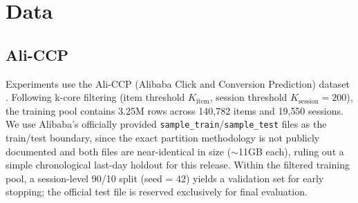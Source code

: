 %
%
%

\section{Data}
\label{sec:data}

\subsection{Ali-CCP}
\label{sec:data-aliccp}

Experiments use the Ali-CCP (Alibaba Click and Conversion Prediction) dataset \cite{ma2018esmm}. Following k-core filtering (item threshold $K_{\text{item}}$, session threshold $K_{\text{session}}=200$), the training pool contains 3.25M rows across 140{,}782 items and 19{,}550 sessions. We use Alibaba's officially provided \texttt{sample\_train}/\texttt{sample\_test} files as the train/test boundary, since the exact partition methodology is not publicly documented and both files are near-identical in size ($\sim$11GB each), ruling out a simple chronological last-day holdout for this release. Within the filtered training pool, a session-level 90/10 split (seed = 42) yields a validation set for early stopping; the official test file is reserved exclusively for final evaluation.

